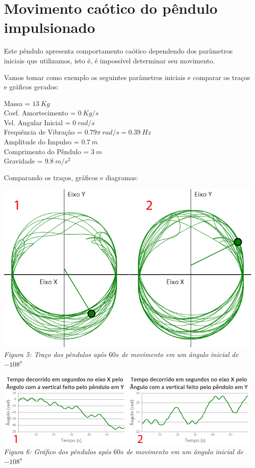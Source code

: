 \documentclass[13pt,a4paper]{report}
\begin{document}
\section{Movimento caótico do pêndulo impulsionado}

Este pêndulo apresenta comportamento caótico dependendo dos parâmetros iniciais que utilizamos, isto é, é impossível determinar seu movimento.

Vamos tomar como exemplo os seguintes parâmetros iniciais e comparar os traços e gráficos gerados:

\begin{center}
Massa = $ 13 \ Kg $
\\[1mm]Coef. Amortecimento = $ 0 \ Kg/s $
\\[1mm]Vel. Angular Inicial = $ 0 \ rad/s $
\\[1mm]Frequência de Vibração = $ 0.79\pi \ rad/s = 0.39 \ Hz $
\\[1mm]Amplitude do Impulso = $ 0.7 \ m $
\\[1mm]Comprimento do Pêndulo = $ 3 \ m $
\\[1mm]Gravidade = $ 9.8 \ m/s^{2} $
\end{center}

Comparando os traços, gráficos e diagramas:


\begin{center}
\includegraphics[scale=0.5]{figuras/figura5.png}
\\
\textit{Figura 5: Traço dos pêndulos após $60 s$ de movimento em um ângulo inicial de $-108^{\underline{o}}$ }
\end{center}
\clearpage

\begin{center}
\includegraphics[scale=0.5]{figuras/figura6.png}
\\
\textit{Figura 6: Gráfico dos pêndulos após $60 s$ de movimento em um ângulo inicial de $-108^{\underline{o}}$ }
\end{center}
\end{document}
